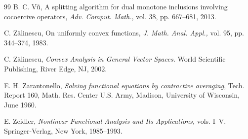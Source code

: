 \documentclass[a4paper,11pt,fleqn]{article}
\theoremstyle{plain}{\theorembodyfont{\rmfamily}%
\newtheorem{conjecture}[theorem]{Conjecture}}
\theoremstyle{plain}{\theorembodyfont{\rmfamily}%
\newtheorem{example}[theorem]{Example}}
\theoremstyle{plain}{\theorembodyfont{\rmfamily}%
\newtheorem{remark}[theorem]{Remark}}
\theoremstyle{plain}{\theorembodyfont{\rmfamily}%
\newtheorem{algorithm}[theorem]{Algorithm}}
\theoremstyle{plain}{\theorembodyfont{\rmfamily}%
\newtheorem{condition}[theorem]{Condition}}
\theoremstyle{plain}{\theorembodyfont{\rmfamily}%
\newtheorem{definition}[theorem]{Definition}}
\theoremstyle{plain}{\theorembodyfont{\rmfamily}
\newtheorem{problem}[theorem]{Problem}}
\theoremstyle{plain}{\theorembodyfont{\rmfamily}
\newtheorem{notation}[theorem]{Notation}}
\numberwithin{equation}{section}
\begin{document}
\begin{thebibliography}{99}
B. C. V\~u, A splitting algorithm for dual monotone inclusions 
involving cocoercive operators, 
{\em Adv. Comput. Math.}, 
vol. 38, pp. 667--681, 2013.

C. Z\u{a}linescu, 
On uniformly convex functions, 
{\em J. Math. Anal. Appl.,} 
vol. 95, pp. 344--374, 1983.

C. Z\u{a}linescu, 
{\em Convex Analysis in General Vector Spaces.} 
World Scientific Publishing, River Edge, NJ, 2002.

E. H. Zarantonello, 
{\em Solving functional equations by contractive averaging}, 
Tech. Report 160, Math. Res. Center U.S. Army, Madison,
University of Wisconsin, June 1960.

E. Zeidler,
{\em Nonlinear Functional Analysis and Its Applications,} 
vols. I--V.
Springer-Verlag, New York, 1985--1993.
\end{thebibliography}
\end{document}
